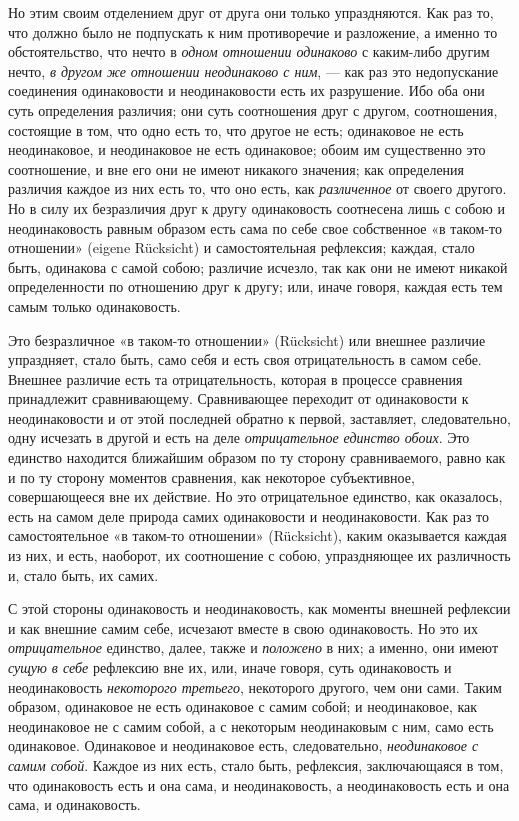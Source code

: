 Но этим своим отделением друг от друга они только упраздняются. Как раз то,
что должно было не подпускать к ним противоречие и разложение, а именно то
обстоятельство, что нечто в {\em одном отношении
одинаково} с каким-либо другим нечто, {\em в другом же
}{\em отношении неодинаково с ним}, — как раз это
недопускание соединения одинаковости и неодинаковости есть их разрушение.
Ибо оба они суть определения различия; они суть соотношения друг с другом,
соотношения, состоящие в том, что одно есть то, что другое не есть;
одинаковое не есть неодинаковое, и неодинаковое не есть одинаковое; обоим
им существенно это соотношение, и вне его они не имеют никакого значения;
как определения различия каждое из них есть то, что оно есть, как
{\em различенное} от своего другого. Но в силу их
безразличия друг к другу одинаковость соотнесена лишь с собою и
неодинаковость равным образом есть сама по себе свое собственное «в
таком-то отношении» (eigene Rücksicht) и самостоятельная рефлексия; каждая,
стало быть, одинакова с самой собою; различие исчезло, так как они не имеют
никакой определенности по отношению друг к другу; или, иначе говоря, каждая
есть тем самым только одинаковость.

Это безразличное «в таком-то отношении» (Rücksicht) или внешнее различие
упраздняет, стало быть, само себя и есть своя отрицательность в самом себе.
Внешнее различие есть та отрицательность, которая в процессе сравнения
принадлежит сравнивающему. Сравнивающее переходит от одинаковости к
неодинаковости и от этой последней обратно к первой, заставляет,
следовательно, одну исчезать в другой и есть на деле
{\em отрицательное единство обоих}. Это единство
находится ближайшим образом по ту сторону сравниваемого, равно как и по ту
сторону моментов сравнения, как некоторое субъективное, совершающееся вне
их действие. Но это отрицательное единство, как оказалось, есть на самом
деле природа самих одинаковости и неодинаковости. Как раз то
самостоятельное «в таком-то отношении» (Rücksicht), каким оказывается
каждая из них, и есть, наоборот, их соотношение с собою, упраздняющее их
различность и, стало быть, их самих.

С этой стороны одинаковость и неодинаковость, как моменты внешней рефлексии
и как внешние самим себе, исчезают вместе в свою одинаковость. Но это их
{\em отрицательное} единство, далее, также и
{\em положено} в них; а именно, они имеют
{\em сущую в себе} рефлексию вне их, или, иначе говоря,
суть одинаковость и неодинаковость {\em некоторого
третьего}, некоторого другого, чем они сами. Таким образом, одинаковое не
есть одинаковое с самим собой; и неодинаковое, как неодинаковое не с самим
собой, а с некоторым неодинаковым с ним, само есть одинаковое. Одинаковое и
неодинаковое есть, следовательно, {\em неодинаковое с
самим собой}. Каждое из них есть, стало быть, рефлексия, заключающаяся в
том, что одинаковость есть и она сама, и неодинаковость, а неодинаковость
есть и она сама, и одинаковость.

